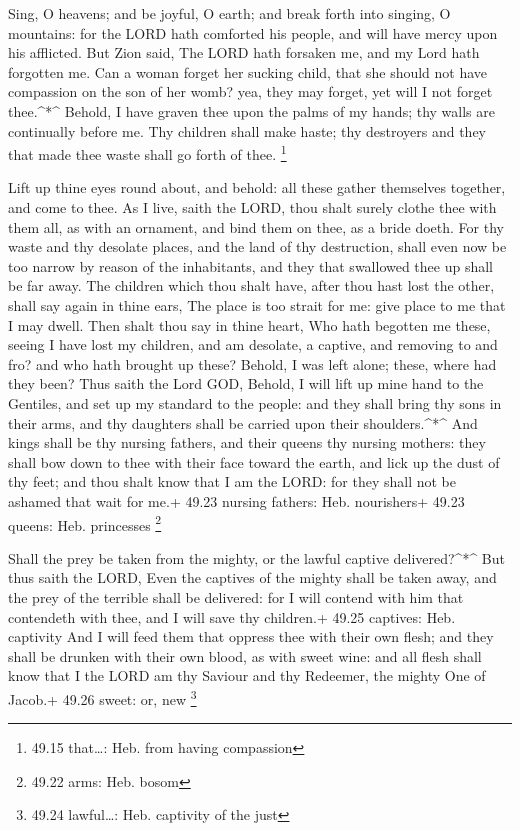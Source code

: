  Sing, O heavens; and be joyful, O earth; and break forth
into singing, O mountains: for the LORD hath comforted his people, and
will have mercy upon his afflicted.  But Zion said, The
LORD hath forsaken me, and my Lord hath forgotten me.  Can
a woman forget her sucking child, that she should not have compassion on
the son of her womb? yea, they may forget, yet will I not forget
thee.\^{}*\^{}  Behold, I have graven thee upon the palms
of my hands; thy walls are continually before me.  Thy
children shall make haste; thy destroyers and they that made thee waste
shall go forth of thee. \footnote{49.15 that\ldots: Heb. from having
  compassion}

 Lift up thine eyes round about, and behold: all these
gather themselves together, and come to thee. As I live, saith the LORD,
thou shalt surely clothe thee with them all, as with an ornament, and
bind them on thee, as a bride doeth.  For thy waste and thy
desolate places, and the land of thy destruction, shall even now be too
narrow by reason of the inhabitants, and they that swallowed thee up
shall be far away.  The children which thou shalt have,
after thou hast lost the other, shall say again in thine ears, The place
is too strait for me: give place to me that I may dwell. 
Then shalt thou say in thine heart, Who hath begotten me these, seeing I
have lost my children, and am desolate, a captive, and removing to and
fro? and who hath brought up these? Behold, I was left alone; these,
where had they been?  Thus saith the Lord GOD, Behold, I
will lift up mine hand to the Gentiles, and set up my standard to the
people: and they shall bring thy sons in their arms, and thy daughters
shall be carried upon their shoulders.\^{}*\^{}  And kings
shall be thy nursing fathers, and their queens thy nursing mothers: they
shall bow down to thee with their face toward the earth, and lick up the
dust of thy feet; and thou shalt know that I am the LORD: for they shall
not be ashamed that wait for me.+ 49.23 nursing fathers: Heb.
nourishers+ 49.23 queens: Heb. princesses \footnote{49.22 arms: Heb.
  bosom}

 Shall the prey be taken from the mighty, or the lawful
captive delivered?\^{}*\^{}  But thus saith the LORD, Even
the captives of the mighty shall be taken away, and the prey of the
terrible shall be delivered: for I will contend with him that contendeth
with thee, and I will save thy children.+ 49.25 captives: Heb. captivity
 And I will feed them that oppress thee with their own
flesh; and they shall be drunken with their own blood, as with sweet
wine: and all flesh shall know that I the LORD am thy Saviour and thy
Redeemer, the mighty One of Jacob.+ 49.26 sweet: or, new \footnote{49.24
  lawful\ldots: Heb. captivity of the just}

